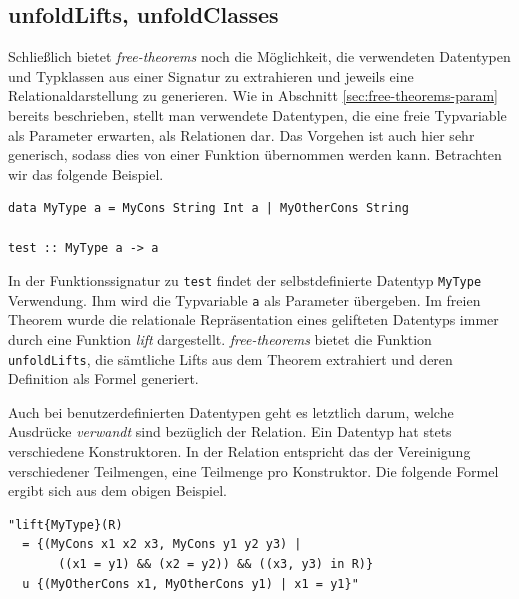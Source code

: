 \subsection{unfoldLifts, unfoldClasses}


Schließlich bietet \textit{free-theorems} noch die Möglichkeit, die verwendeten Datentypen und Typklassen aus einer
Signatur zu extrahieren und jeweils eine Relationaldarstellung zu generieren. Wie in Abschnitt \ref{sec:free-theorems-param}
bereits beschrieben, stellt man verwendete Datentypen, die eine freie Typvariable als Parameter erwarten, als Relationen
dar. Das Vorgehen ist auch hier sehr generisch, sodass dies von einer Funktion übernommen werden kann. Betrachten wir
das folgende Beispiel.

\begin{verbatim}
data MyType a = MyCons String Int a | MyOtherCons String

test :: MyType a -> a
\end{verbatim}

In der Funktionssignatur zu \texttt{test} findet der selbstdefinierte Datentyp \texttt{MyType} Verwendung. Ihm wird die
Typvariable \texttt{a} als Parameter übergeben. Im freien Theorem wurde die relationale Repräsentation eines gelifteten
Datentyps immer durch eine Funktion \textit{lift} dargestellt. \textit{free-theorems} bietet die Funktion \texttt{unfoldLifts},
die sämtliche Lifts aus dem Theorem extrahiert und deren Definition als Formel generiert.

Auch bei benutzerdefinierten Datentypen geht es letztlich darum, welche Ausdrücke \textit{verwandt} sind bezüglich der
Relation. Ein Datentyp hat stets verschiedene Konstruktoren. In der Relation entspricht das der Vereinigung verschiedener
Teilmengen, eine Teilmenge pro Konstruktor. Die folgende Formel ergibt sich aus dem obigen Beispiel.

\begin{verbatim}
"lift{MyType}(R)
  = {(MyCons x1 x2 x3, MyCons y1 y2 y3) |
       ((x1 = y1) && (x2 = y2)) && ((x3, y3) in R)}
  u {(MyOtherCons x1, MyOtherCons y1) | x1 = y1}"
\end{verbatim}

